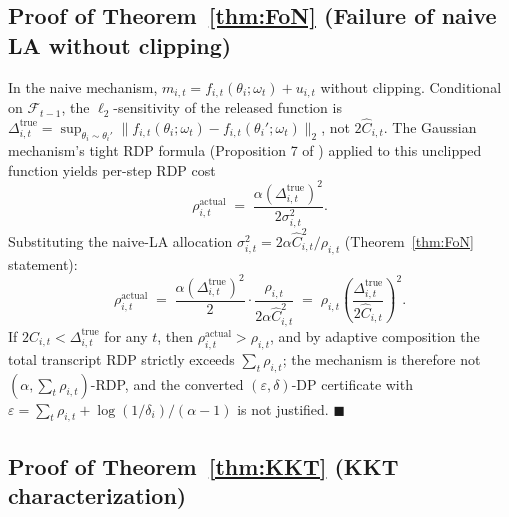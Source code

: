 \documentclass{article}
\begin{document}
\subsection{Proof of Theorem~\ref{thm:FoN} (Failure of naive LA without clipping)}\label{app:FoN}
In the naive mechanism, $m_{i,t} = f_{i,t}(\theta_i; \omega_t) + u_{i,t}$ without clipping. Conditional on $\mathcal{F}_{t-1}$, the $\ell_2$-sensitivity of the released function is $\Delta_{i,t}^{\mathrm{true}} = \sup_{\theta_i \sim \theta_i'} \|f_{i,t}(\theta_i;\omega_t) - f_{i,t}(\theta_i';\omega_t)\|_2$, not $2\hat C_{i,t}$. The Gaussian mechanism's tight RDP formula (Proposition 7 of \citet{mironov2017renyi}) applied to this unclipped function yields per-step RDP cost
$$\rho_{i,t}^{\mathrm{actual}} \;=\; \frac{\alpha (\Delta_{i,t}^{\mathrm{true}})^2}{2\sigma_{i,t}^2}.$$
Substituting the naive-LA allocation $\sigma_{i,t}^2 = 2\alpha \hat C_{i,t}^2/\rho_{i,t}$ (Theorem~\ref{thm:FoN} statement):
$$\rho_{i,t}^{\mathrm{actual}} \;=\; \frac{\alpha (\Delta_{i,t}^{\mathrm{true}})^2}{2} \cdot \frac{\rho_{i,t}}{2\alpha \hat C_{i,t}^2} \;=\; \rho_{i,t}\left(\frac{\Delta_{i,t}^{\mathrm{true}}}{2\hat C_{i,t}}\right)^2.$$
If $2\hat C_{i,t} < \Delta_{i,t}^{\mathrm{true}}$ for any $t$, then $\rho_{i,t}^{\mathrm{actual}} > \rho_{i,t}$, and by adaptive composition the total transcript RDP strictly exceeds $\sum_t \rho_{i,t}$; the mechanism is therefore not $(\alpha, \sum_t \rho_{i,t})$-RDP, and the converted $(\varepsilon,\delta)$-DP certificate with $\varepsilon = \sum_t \rho_{i,t} + \log(1/\delta_i)/(\alpha-1)$ is not justified. $\blacksquare$

\subsection{Proof of Theorem~\ref{thm:KKT} (KKT characterization)}\label{app:KKT}
\end{document}
